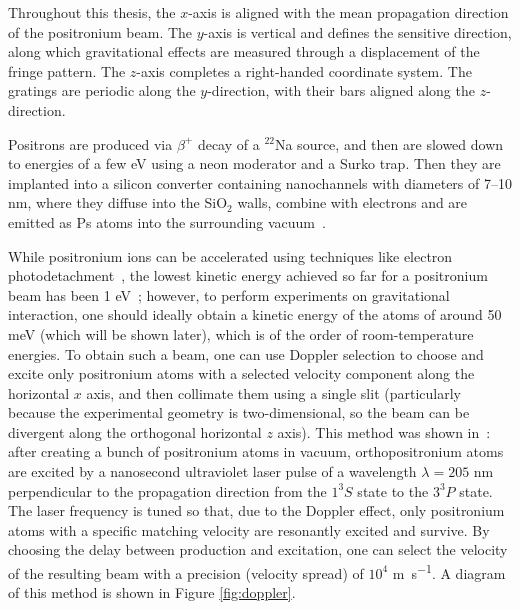 \documentclass[12pt]{report}
\begin{document}
Throughout this thesis, the $x$-axis is aligned with the mean propagation direction of the positronium beam. The $y$-axis is vertical and defines the sensitive direction, along which gravitational effects are measured through a displacement of the fringe pattern. The $z$-axis completes a right-handed coordinate system. The gratings are periodic along the $y$-direction, with their bars aligned along the $z$-direction.

Positrons are produced via \(\beta^+\) decay of a $^{22}$Na source, and then are slowed down to energies of a few eV using a neon moderator and a Surko trap. Then they are implanted into a silicon converter containing nanochannels with diameters of 7--10 nm, where they diffuse into the SiO$_2$ walls, combine with electrons and are emitted as Ps atoms into the surrounding vacuum~\cite{PhysRevB.81.235418}.

While positronium ions can be accelerated using techniques like electron photodetachment~\cite{Michishio_Tachibana_Suzuki_Wada_Yagishita_Hyodo_Nagashima_2012}, the lowest kinetic energy achieved so far for a positronium beam has been 1 eV~\cite{Fayer_2015}; however, to perform experiments on gravitational interaction, one should ideally obtain a kinetic energy of the atoms of around 50 meV (which will be shown later), which is of the order of room-temperature energies. To obtain such a beam, one can use Doppler selection to choose and excite only positronium atoms with a selected velocity component along the horizontal $x$ axis, and then collimate them using a single slit (particularly because the experimental geometry is two-dimensional, so the beam can be divergent along the orthogonal horizontal $z$ axis). 
This method was shown in~\cite{PhysRevA.99.033405}: after creating a bunch of positronium atoms in vacuum, orthopositronium atoms are excited by a nanosecond ultraviolet laser pulse of a wavelength $\lambda=205$ nm perpendicular to the propagation direction from the $1^3S$ state to the $3^3P$ state. 
The laser frequency is tuned so that, due to the Doppler effect, only positronium atoms with a specific matching velocity are resonantly excited and survive.
By choosing the delay between production and excitation, one can select the velocity of the resulting beam with a precision (velocity spread) of $10^4$ \si{\metre\per\second}. 
A diagram of this method is shown in Figure \ref{fig:doppler}.
\end{document}
